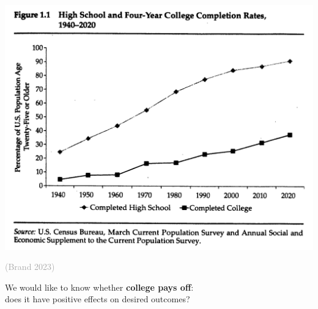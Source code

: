 \documentclass{beamer}
\newcommand\mycite[1]{\begin{scriptsize}\textcolor{darkgray}{(#1)}\end{scriptsize}}
\begin{document}
\begin{frame}

\includegraphics[width = .9\textwidth]{figures/brand_fig1}\\\hfill\mycite{Brand 2023}

\end{frame}

\begin{frame}

We would like to know whether \textbf{college pays off}:\\
does it have positive effects on desired outcomes?

\end{frame}
\end{document}
